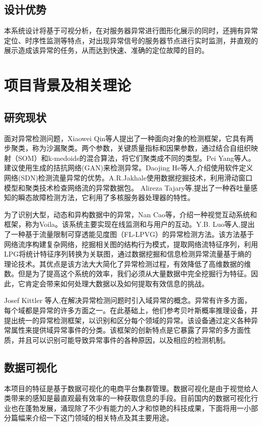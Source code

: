 \subsection{设计优势}
本系统设计将基于可视分析，在对服务器异常进行图形化展示的同时，还拥有异常定位、时序性监测等特点，对出现异常信号的服务器节点进行实时监测，并直观的展示造成该异常的任务，从而达到快速、准确的定位故障的目的。
\section{项目背景及相关理论}
\subsection{研究现状}
{面对异常检测问题}\cite{article2}，Xiaowei Qin等人提出了一种{面向对象的检测框架}\cite{article3}，它具有两步聚类，称为沙漏聚类。两个参数，关键质量指标和因果参数，通过结合自组织映射（SOM）和k-medoids的混合算法，将它们聚类成不同的类型。{Pei Yang等人}\cite{article4}。建议使用生成的拮抗网络(GAN)来检测异常。{Daojing He等人}\cite{article6},介绍使用软件定义网络(SDN)检测流量异常的优势。A.R.Jakhale\cite{article10}使用{数据挖掘}\cite{article7}\cite{article8}\cite{article9}技术，利用滑动窗口模型和聚类技术检查网络流的异常数据包。 {Alireza Tajary}\cite{article11}等,提出了一种吞吐量感知的瞬态故障检测方法，它利用了多核服务器处理器的特性。

为了识别大型，动态和异构数据中的异常\cite{article14}，Nan Cao等，介绍一种视觉互动\cite{article20}\cite{article21}\cite{article22}系统和框架，称为Voila。该系统主要实现在线监测和与用户的互动。{Y.B. Luo等人}\cite{article23},提出了一种基于流量限制可穿透能见度图（FL-LPVG）的异常检测方法。该方法基于网络流序构建复杂网络，挖掘相关图的结构行为模式，提取网络流特征序列，利用LPG将统计特征序列转换为关联图，通过数据挖掘和信息检测异常流量基于熵的理论技术。其优点是该方法大大简化了异常检测过程，有效降低了高维数据的维数。但是为了提高这个系统的效率，我们必须从大量数据中完全挖掘行为特征。因此，它肯定会带来如何处理大数据以及如何提取有效信息的挑战。

{Josef Kittler 等人}\cite{article27},在解决异常检测问题时引入{域异常的概念}\cite{article24}\cite{article25}。异常有许多方面，每个域都是异常的许多方面之一。在此基础上，他们参考贝叶斯概率推理设备，并提出统一的{异常检测框架}\cite{article26}，以识别和区分每个领域的异常。该设备通过定义各种异常属性来提供域异常事件的分类。该框架的创新特点是它暴露了异常的多方面性质，并且可以识别可能导致异常事件的各种原因，以及相应的检测机制。

\subsection{数据可视化}
本项目的特征是基于数据可视化的电商平台集群管理。数据可视化是由于视觉给人类带来的感知是最直观最有效率的一种获取信息的手段。目前国内的数据可视化行业也在蓬勃发展，涌现除了不少有能力的人才和惊艳的科技成果，下面将用一小部分篇幅来介绍一下这门领域的相关特点及其主要用途。

